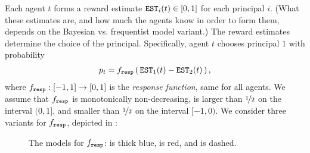  Each agent $t$ forms a reward estimate $\mathtt{EST}_i(t)\in [0,1]$ for each principal $i$. (What these estimates are, and how much the agents know in order to form them, depends on the Bayesian vs. frequentist model variant.)
The reward estimates determine the choice of the principal. Specifically, agent $t$ chooses principal $1$ with probability
\begin{align}\label{eq:model-f}
p_t = f_{\mathtt{resp}}\left(\, \mathtt{EST}_1(t) - \mathtt{EST}_2(t) \,\right),
\end{align}
where $f_{\mathtt{resp}}:[-1,1]\to [0,1]$ is the \emph{response function}, same for all agents. We assume that $f_{\mathtt{resp}}$ is monotonically non-decreasing, is larger than $\nicefrac12$ on the interval $(0,1]$, and smaller than $\nicefrac12$ on the interval $[-1,0)$. We consider three variants for $f_{\mathtt{resp}}$, depicted in  :

\begin{figure}[t]
\begin{center}
\end{center}
\caption{The models for $f_{\mathtt{resp}}$: \HardMax is thick blue, \HardMaxRandom is red, and \SoftMaxRandom is dashed.}
\label{fig:response-functions}
\end{figure}


